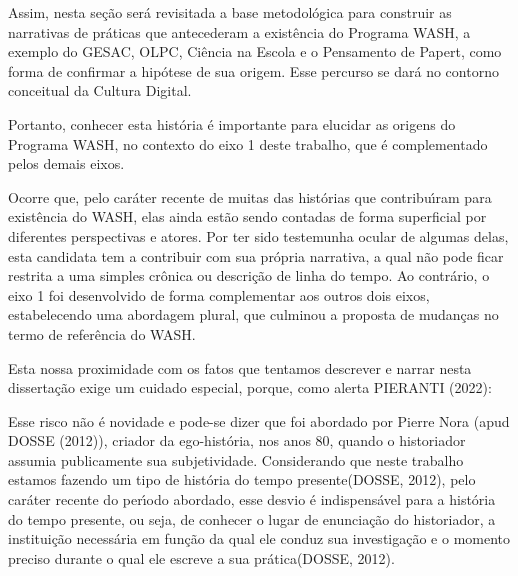 \documentclass[
12pt,		%
openright,	%
twoside,  %
a4paper,			%
chapter=TITLE,		%
english,			%
french,				%
spanish,			%
brazil				%
]{USPSC-classe/USPSC}
\begin{document}
Assim, nesta se\c{c}\~ao ser\'a revisitada a base metodol\'ogica para construir as narrativas de pr\'aticas  que antecederam a exist\^encia do Programa WASH, a exemplo do GESAC, OLPC, Ci\^encia na Escola e o Pensamento de Papert, como forma de confirmar a hip\'otese de sua origem. Esse percurso se dar\'a no contorno conceitual da Cultura Digital.




Portanto, conhecer esta hist\'oria \'e importante para elucidar as origens do Programa WASH, no contexto do eixo 1 deste trabalho, que \'e complementado pelos demais eixos.




Ocorre que, pelo car\'ater recente de muitas das hist\'orias que contribu\'{\i}ram para exist\^encia do WASH, elas ainda est\~ao sendo contadas de forma superficial por diferentes perspectivas e atores. Por ter sido testemunha ocular de algumas delas, esta candidata tem a contribuir com sua pr\'opria narrativa, a qual n\~ao pode ficar restrita a uma simples cr\^onica ou descri\c{c}\~ao de linha do tempo. Ao contr\'ario, o eixo 1 foi desenvolvido de forma complementar aos outros dois eixos, estabelecendo uma abordagem plural, que culminou a proposta de mudan\c{c}as no termo de refer\^encia do WASH.




Esta nossa proximidade com os fatos que tentamos descrever e narrar nesta disserta\c{c}\~ao exige um cuidado especial, porque, como alerta  PIERANTI (2022):





\noindent\begin{center}\mbox{\centering{}}\end{center}


Esse risco n\~ao \'e novidade e pode-se dizer que foi abordado por Pierre Nora  (apud DOSSE (2012)), criador da ego-hist\'oria, nos anos 80, quando o historiador assumia publicamente sua subjetividade. Considerando que neste trabalho estamos fazendo um tipo de \textquotedbl hist\'oria do tempo presente\textquotedbl   (DOSSE, 2012), pelo car\'ater recente do per\'{\i}odo abordado, \textquotedbl esse desvio \'e indispens\'avel para a hist\'oria do tempo presente, ou seja, de conhecer o lugar de enuncia\c{c}\~ao do historiador, a institui\c{c}\~ao necess\'aria em fun\c{c}\~ao da qual ele conduz sua investiga\c{c}\~ao e o momento preciso durante o qual ele escreve a sua pr\'atica\textquotedbl   (DOSSE, 2012).
\end{document}
